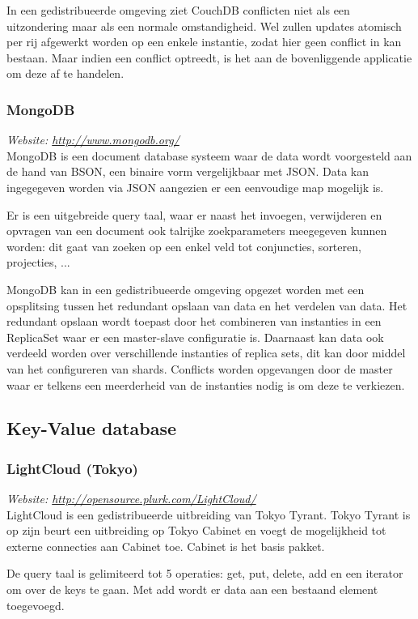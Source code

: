 In een gedistribueerde omgeving ziet CouchDB conflicten niet als een uitzondering maar als een normale omstandigheid. Wel zullen updates atomisch per rij afgewerkt worden op een enkele instantie, zodat hier geen conflict in kan bestaan. Maar indien een conflict optreedt, is het aan de bovenliggende applicatie om deze af te handelen. 

\subsubsection{MongoDB}
\textit{Website: \url{http://www.mongodb.org/}}\\
MongoDB is een document database systeem waar de data wordt voorgesteld aan de hand van BSON, een binaire vorm vergelijkbaar met JSON. Data kan ingegegeven worden via JSON aangezien er een eenvoudige map mogelijk is. 

Er is een uitgebreide query taal, waar er naast het invoegen, verwijderen en opvragen van een document ook talrijke zoekparameters meegegeven kunnen worden: dit gaat van zoeken op een enkel veld tot conjuncties, sorteren, projecties, ... 

MongoDB kan in een gedistribueerde omgeving opgezet worden met een opsplitsing tussen het redundant opslaan van data en het verdelen van data. Het redundant opslaan wordt toepast door het combineren van instanties in een ReplicaSet waar er een master-slave configuratie is. Daarnaast kan data ook verdeeld worden over verschillende instanties of replica sets, dit kan door middel van het configureren van shards. 
Conflicts worden opgevangen door de master waar er telkens een meerderheid van de instanties nodig is om deze te verkiezen. 

\subsection{Key-Value database}
\subsubsection{LightCloud (Tokyo)}
\textit{Website: \url{http://opensource.plurk.com/LightCloud/}}\\
LightCloud is een gedistribueerde uitbreiding van Tokyo Tyrant. Tokyo Tyrant is op zijn beurt een uitbreiding op Tokyo Cabinet en voegt de mogelijkheid tot externe connecties aan Cabinet toe. Cabinet is het basis pakket. 

De query taal is gelimiteerd tot 5 operaties: get, put, delete, add en een iterator om over de keys te gaan. Met add wordt er data aan een bestaand element toegevoegd. 

